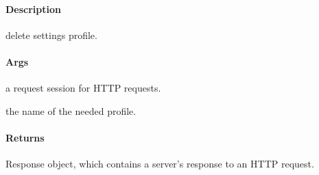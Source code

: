 \documentclass[letterpaper,10pt,english]{sphinxmanual}
\begin{document}

\begin{fulllineitems}
\label{\detokenize{gemini_perception_API:gemini_perception_API.remove_perception_profile}}
\pysigstartsignatures
{}
\pysigstopsignatures

\paragraph{Description}
\label{\detokenize{gemini_perception_API:id26}}
\sphinxAtStartPar
delete settings profile.


\paragraph{Args}
\label{\detokenize{gemini_perception_API:id27}}\begin{description}
\sphinxAtStartPar
a request session for HTTP requests.

\sphinxAtStartPar
the name of the needed profile.

\end{description}


\paragraph{Returns}
\label{\detokenize{gemini_perception_API:id28}}\begin{description}
\sphinxAtStartPar
Response object, which contains a server’s response to an HTTP request.

\end{description}

\end{fulllineitems}

\end{document}
